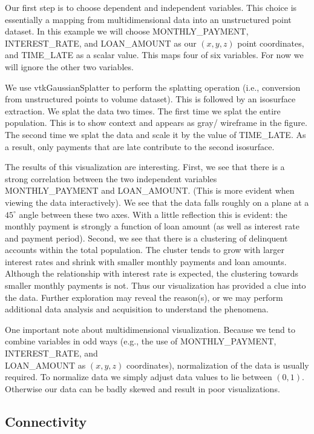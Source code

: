 Our first step is to choose dependent and independent variables. This choice is essentially a mapping from multidimensional data into an unstructured point dataset. In this example we will choose MONTHLY\_PAYMENT, INTEREST\_RATE, and LOAN\_AMOUNT as our $(x, y, z)$ point coordinates, and TIME\_LATE as a scalar value. This maps four of six variables. For now we will ignore the other two variables.

We use vtkGaussianSplatter to perform the splatting operation (i.e., conversion from unstructured points to volume dataset). This is followed by an isosurface extraction. We splat the data two times. The first time we splat the entire population. This is to show context and appears as gray/ wireframe in the figure. The second time we splat the data and scale it by the value of TIME\_LATE. As a result, only payments that are late contribute to the second isosurface.

The results of this visualization are interesting. First, we see that there is a strong correlation between the two independent variables MONTHLY\_PAYMENT and LOAN\_AMOUNT. (This is more evident when viewing the data interactively). We see that the data falls roughly on a plane at a $45^\circ$ angle between these two axes. With a little reflection this is evident: the monthly payment is strongly a function of loan amount (as well as interest rate and payment period). Second, we see that there is a clustering of delinquent accounts within the total population. The cluster tends to grow with larger interest rates and shrink with smaller monthly payments and loan amounts. Although the relationship with interest rate is expected, the clustering towards smaller monthly payments is not. Thus our visualization has provided a clue into the data. Further exploration may reveal the reason(s), or we may perform additional data analysis and acquisition to understand the phenomena.

One important note about multidimensional visualization. Because we tend to combine variables in odd ways (e.g., the use of MONTHLY\_PAYMENT, INTEREST\_RATE, and \\ LOAN\_AMOUNT as $(x, y, z)$ coordinates), normalization of the data is usually required. To normalize data we simply adjust data values to lie between $(0,1)$. Otherwise our data can be badly skewed and result in poor visualizations.

\subsection{Connectivity}

